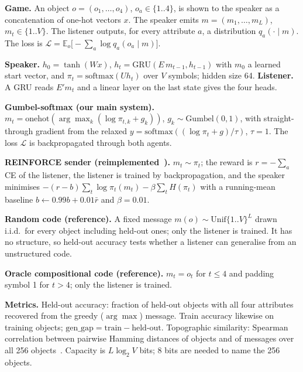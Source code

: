 \textbf{Game.} An object $o=(o_1,\dots,o_4)$, $o_a\in\{1..4\}$, is shown to the speaker as a concatenation of one-hot vectors $x$. The speaker emits $m=(m_1,\dots,m_L)$, $m_t\in\{1..V\}$. The listener outputs, for every attribute $a$, a distribution $q_a(\cdot\mid m)$. The loss is $\mathcal L=\mathbb E_o\big[-\sum_{a}\log q_a(o_a\mid m)\big]$.

\textbf{Speaker.} $h_0=\tanh(W x)$, $h_t=\mathrm{GRU}(E\,m_{t-1},h_{t-1})$ with $m_0$ a learned start vector, and $\pi_t=\mathrm{softmax}(U h_t)$ over $V$ symbols; hidden size 64. \textbf{Listener.} A GRU reads $E'm_t$ and a linear layer on the last state gives the four heads.

\textbf{Gumbel-softmax (our main system).} $m_t=\mathrm{onehot}(\arg\max_k(\log\pi_{t,k}+g_k))$, $g_k\sim\mathrm{Gumbel}(0,1)$, with straight-through gradient from the relaxed $y=\mathrm{softmax}((\log\pi_t+g)/\tau)$, $\tau=1$. The loss $\mathcal L$ is backpropagated through both agents.

\textbf{REINFORCE sender (reimplemented~\cite{williams1992simple}).} $m_t\sim\pi_t$; the reward is $r=-\sum_a$ CE of the listener, the listener is trained by backpropagation, and the speaker minimises $-(r-b)\sum_t\log\pi_t(m_t)-\beta\sum_t H(\pi_t)$ with a running-mean baseline $b\leftarrow0.99b+0.01\bar r$ and $\beta=0.01$.

\textbf{Random code (reference).} A fixed message $m(o)\sim\mathrm{Unif}\{1..V\}^L$ drawn i.i.d.\ for every object including held-out ones; only the listener is trained. It has no structure, so held-out accuracy tests whether a listener can generalise from an unstructured code.

\textbf{Oracle compositional code (reference).} $m_t=o_t$ for $t\le4$ and padding symbol 1 for $t>4$; only the listener is trained.

\textbf{Metrics.} Held-out accuracy: fraction of held-out objects with all four attributes recovered from the greedy ($\arg\max$) message. Train accuracy likewise on training objects; $\text{gen\_gap}=\text{train}-\text{held-out}$. Topographic similarity: Spearman correlation between pairwise Hamming distances of objects and of messages over all 256 objects~\cite{brighton2006understanding}. Capacity is $L\log_2V$ bits; 8 bits are needed to name the 256 objects.
